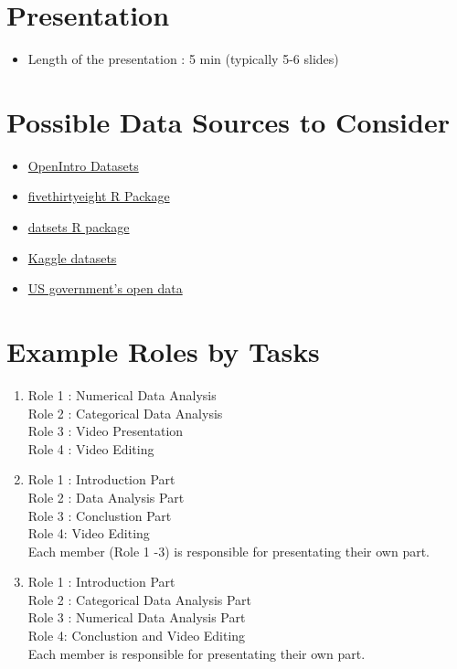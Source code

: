 \documentclass[12pt]{article}
\begin{document}
\section*{Presentation}
\begin{itemize}
    \item Length of the presentation : 5 min (typically 5-6 slides)

\end{itemize}



\section*{Possible Data Sources to Consider}
\begin{itemize}
    \item \href{https://www.openintro.org/data/}{OpenIntro Datasets}
    \item \href{https://cran.r-project.org/web/packages/fivethirtyeight/vignettes/fivethirtyeight.html}{fivethirtyeight 
    R Package}
    \item \href{https://stat.ethz.ch/R-manual/R-devel/library/datasets/html/00Index.html}{datsets R package}
    \item \href{https://www.kaggle.com/datasets}{Kaggle datasets}
    \item \href{https://data.gov/}{US government's open data}
\end{itemize}

\section*{Example Roles by Tasks}
\begin{enumerate}
    \item Role 1 : Numerical Data Analysis \\
    Role 2 : Categorical Data Analysis \\
    Role 3 : Video Presentation \\
    Role 4 : Video Editing \\
    \item Role 1 : Introduction Part   \\
    Role 2 : Data Analysis Part \\
    Role 3 : Conclustion Part \\
    Role 4: Video Editing  \\
    Each member (Role 1 -3) is responsible for presentating their own part. \\
    \item Role 1 : Introduction Part   \\
    Role 2 :  Categorical Data Analysis  Part \\
    Role 3 : Numerical Data Analysis Part\\
    Role 4: Conclustion and Video Editing \\
    Each member is responsible for presentating their own part. \\
\end{enumerate}
\end{document}
